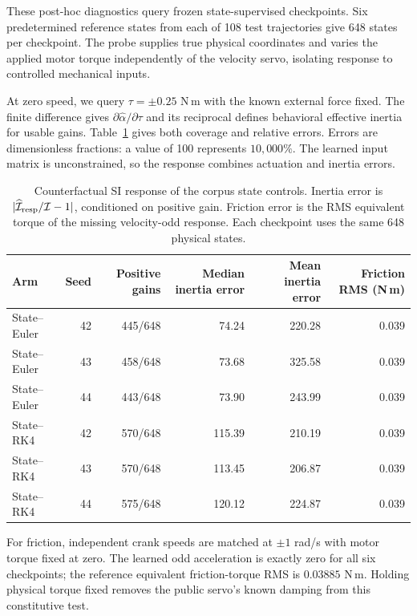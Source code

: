 These post-hoc diagnostics query frozen state-supervised checkpoints. Six predetermined reference states from each of 108 test trajectories give 648 states per checkpoint. The probe supplies true physical coordinates and varies the applied motor torque independently of the velocity servo, isolating response to controlled mechanical inputs.

At zero speed, we query $\tau=\pm0.25$ N\,m with the known external force fixed. The finite difference gives $\partial\widehat\alpha/\partial\tau$ and its reciprocal defines behavioral effective inertia for usable gains. Table~\ref{app:corpus-response} gives both coverage and relative errors. Errors are dimensionless fractions: a value of 100 represents $10{,}000\%$. The learned input matrix is unconstrained, so the response combines actuation and inertia errors.

\begin{table}[t]
\caption{Counterfactual SI response of the corpus state controls. Inertia error is $|\widehat{\mathcal I}_{\rm resp}/\mathcal I-1|$, conditioned on positive gain. Friction error is the RMS equivalent torque of the missing velocity-odd response. Each checkpoint uses the same 648 physical states.}
\label{app:corpus-response}
\centering\small
\begin{tabular}{lrrrrr}
\toprule
Arm & Seed & Positive gains & Median inertia error & Mean inertia error & Friction RMS (N\,m)\\
\midrule
State--Euler & 42 & 445/648 & 74.24 & 220.28 & 0.039 \\
State--Euler & 43 & 458/648 & 73.68 & 325.58 & 0.039 \\
State--Euler & 44 & 443/648 & 73.90 & 243.99 & 0.039 \\
State--RK4 & 42 & 570/648 & 115.39 & 210.19 & 0.039 \\
State--RK4 & 43 & 570/648 & 113.45 & 206.87 & 0.039 \\
State--RK4 & 44 & 575/648 & 120.12 & 224.87 & 0.039 \\
\bottomrule
\end{tabular}
\end{table}

For friction, independent crank speeds are matched at $\pm1$ rad/s with motor torque fixed at zero. The learned odd acceleration is exactly zero for all six checkpoints; the reference equivalent friction-torque RMS is $0.03885$ N\,m. Holding physical torque fixed removes the public servo's known damping from this constitutive test.

